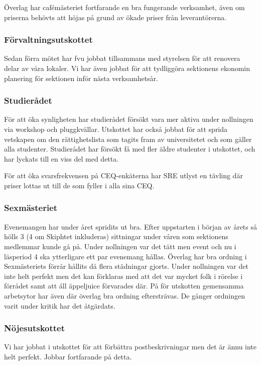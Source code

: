 \documentclass[../_main/handlingar.tex]{subfiles}
\begin{document}
Överlag har cafémästeriet fortfarande en bra fungerande verksamhet, även om priserna behövts att höjas på grund av ökade priser från leverantörerna.

\subsubsection*{Förvaltningsutskottet}
Sedan förra mötet har fvu jobbat tillsammans med styrelsen för att renovera delar av våra lokaler. Vi har även jobbat för att tydliggöra sektionens ekonomin planering för sektionen inför nästa verksamhetsår.

\subsubsection*{Studierådet}
För att öka synligheten har studierådet försökt vara mer aktiva under nollningen via workshop och pluggkvällar. Utskottet har också jobbat för att sprida vetskapen om den rättighetslista som tagits fram av universitetet och som gäller alla studenter. Studierådet har försökt få med fler äldre studenter i utskottet, och har lyckats till en viss del med detta.

För att öka svarsfrekvensen på CEQ-enkäterna har SRE utlyst en tävling där priser lottas ut till de som fyller i alla sina CEQ.

\subsubsection*{Sexmästeriet}
Evenemangen har under året spridits ut bra. Efter uppstarten i början av årets så hölls 3 (4 om Skiphtet inkluderas) sittningar under våren som sektionens medlemmar kunde gå på. Under nollningen var det tätt men event och nu i läsperiod 4 ska ytterligare ett par evenemang hållas. Överlag har bra ordning i Sexmästeriets förrår hållits då flera städningar gjorts. Under nollningen var det inte helt perfekt men det kan förklaras med att det var mycket folk i rörelse i förrådet samt att áll äppeljuice förvarades där. På för utskotten gemensamma arbetsytor har även där överlag bra ordning eftersträvas. De gånger ordningen varit under kritik har det åtgärdats.

\subsubsection*{Nöjesutskottet}
Vi har jobbat i utskottet för att förbättra postbeskrivningar men det är ännu inte helt perfekt. Jobbar fortfarande på detta.
\end{document}
